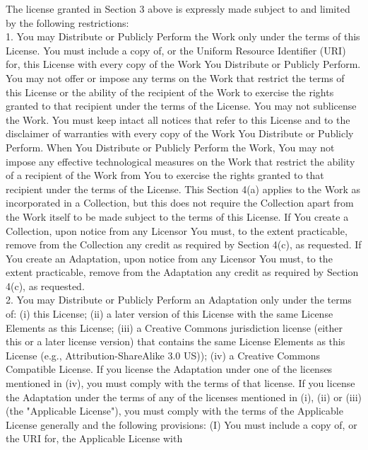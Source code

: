 {The license granted in Section 3 above is expressly made subject to
and limited by the following restrictions:
\\[4pt]
   1. You may Distribute or Publicly Perform the Work only under the
   terms of this License. You must include a copy of, or the Uniform
   Resource Identifier (URI) for, this License with every copy of the
   Work You Distribute or Publicly Perform. You may not offer or
   impose any terms on the Work that restrict the terms of this
   License or the ability of the recipient of the Work to exercise the
   rights granted to that recipient under the terms of the
   License. You may not sublicense the Work. You must keep intact all
   notices that refer to this License and to the disclaimer of
   warranties with every copy of the Work You Distribute or Publicly
   Perform. When You Distribute or Publicly Perform the Work, You may
   not impose any effective technological measures on the Work that
   restrict the ability of a recipient of the Work from You to
   exercise the rights granted to that recipient under the terms of
   the License. This Section 4(a) applies to the Work as incorporated
   in a Collection, but this does not require the Collection apart
   from the Work itself to be made subject to the terms of this
   License. If You create a Collection, upon notice from any Licensor
   You must, to the extent practicable, remove from the Collection any
   credit as required by Section 4(c), as requested. If You create an
   Adaptation, upon notice from any Licensor You must, to the extent
   practicable, remove from the Adaptation any credit as required by
   Section 4(c), as requested.
\\[4pt]
   2. You may Distribute or Publicly Perform an Adaptation only under
   the terms of: (i) this License; (ii) a later version of this
   License with the same License Elements as this License; (iii) a
   Creative Commons jurisdiction license (either this or a later
   license version) that contains the same License Elements as this
   License (e.g., Attribution-ShareAlike 3.0 US)); (iv) a Creative
   Commons Compatible License. If you license the Adaptation under one
   of the licenses mentioned in (iv), you must comply with the terms
   of that license. If you license the Adaptation under the terms of
   any of the licenses mentioned in (i), (ii) or (iii) (the
   "Applicable License"), you must comply with the terms of the
   Applicable License generally and the following provisions: (I) You
   must include a copy of, or the URI for, the Applicable License with
}
